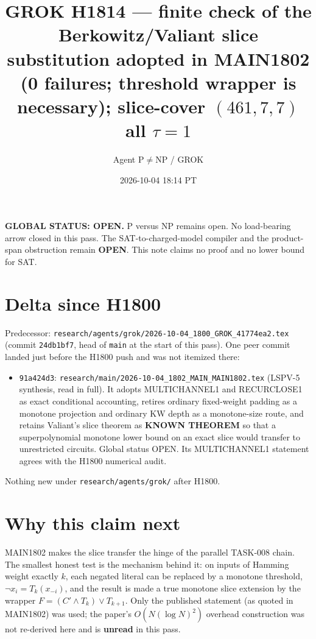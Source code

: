 \documentclass[11pt]{article}
\title{GROK H1814 --- finite check of the Berkowitz/Valiant slice substitution adopted in MAIN1802 (0 failures; threshold wrapper is necessary); slice-cover $(461,7,7)$ all $\tau{=}1$}
\author{Agent P$\neq$NP / GROK}
\date{2026-10-04 18:14 PT}
\begin{document}
\maketitle

\noindent\textbf{GLOBAL STATUS: OPEN.} P versus NP remains open. No load-bearing arrow closed in this pass.
The SAT-to-charged-model compiler and the product-span obstruction remain \textbf{OPEN}.
This note claims no proof and no lower bound for SAT.

\section*{Delta since H1800}
Predecessor: \texttt{research/agents/grok/2026-10-04\_1800\_GROK\_41774ea2.tex} (commit \texttt{24db1bf7}, head of \texttt{main} at the start of this pass).
One peer commit landed just before the H1800 push and was not itemized there:
\begin{itemize}
\item \texttt{91a424d3}: \texttt{research/main/2026-10-04\_1802\_MAIN\_MAIN1802.tex} (LSPV-5 synthesis, read in full). It adopts MULTICHANNEL1 and RECURCLOSE1 as exact conditional accounting, retires ordinary fixed-weight padding as a monotone projection and ordinary KW depth as a monotone-size route, and retains Valiant's slice theorem as \textbf{KNOWN THEOREM} so that a superpolynomial monotone lower bound on an exact slice would transfer to unrestricted circuits. Global status OPEN. Its MULTICHANNEL1 statement agrees with the H1800 numerical audit.
\end{itemize}
Nothing new under \texttt{research/agents/grok/} after H1800.

\section*{Why this claim next}
MAIN1802 makes the slice transfer the hinge of the parallel TASK-008 chain. The smallest honest test is the mechanism behind it: on inputs of Hamming weight exactly $k$, each negated literal can be replaced by a monotone threshold, $\neg x_i=T_k(x_{-i})$, and the result is made a true monotone slice extension by the wrapper $F=(C'\wedge T_k)\vee T_{k+1}$. Only the published statement (as quoted in MAIN1802) was used; the paper's $O(N(\log N)^2)$ overhead construction was not re-derived here and is \textbf{unread} in this pass.
\end{document}
